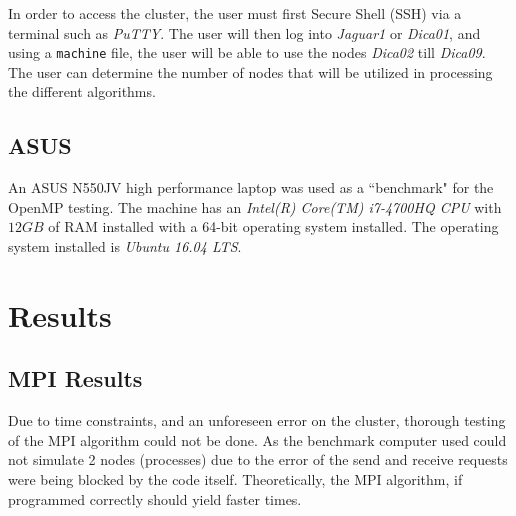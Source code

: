 \documentclass[10pt, conference]{IEEEtran}
\def\code#1{\texttt{#1}}
\begin{document}
In order to access the cluster, the user must first Secure Shell (SSH) via a terminal such as \emph{PuTTY}. The user will then log into \emph{Jaguar1} or \emph{Dica01}, and using a \code{machine} file, the user will be able to use the nodes \emph{Dica02} till \emph{Dica09}. The user can determine the number of nodes that will be utilized in processing the different algorithms.

\subsection{ASUS}
\label{sec: ASUS}
An ASUS N550JV high performance laptop was used as a ``benchmark" for the OpenMP testing. The machine has an \emph{Intel(R) Core(TM) i7-4700HQ CPU} with $12GB$ of RAM installed with a 64-bit operating system installed. The operating system installed is \emph{Ubuntu 16.04 LTS}.

\section{Results}
\label{sec: Results}

\subsection{MPI Results}
\label{sec: MPI Results}
Due to time constraints, and an unforeseen error on the cluster, thorough testing of the MPI algorithm could not be done. As the benchmark computer used could not simulate 2 nodes (processes) due to the error of the send and receive requests were being blocked by the code itself. Theoretically, the MPI algorithm, if programmed correctly should yield faster times.
\end{document}
